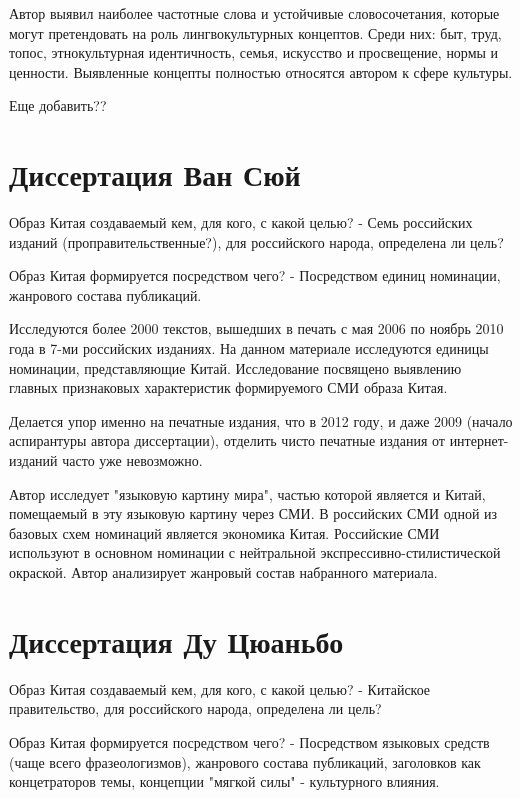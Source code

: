 \documentclass[11pt]{article}
\begin{document}
Автор выявил наиболее частотные слова и устойчивые словосочетания, которые могут претендовать на роль лингвокультурных концептов.
Среди них: быт, труд, топос, этнокультурная идентичность, семья, искусство и просвещение, нормы и ценности.
Выявленные концепты полностью относятся автором к сфере культуры.

Еще добавить??

\section{Диссертация Ван Сюй}\label{sec:section-wangxue}

Образ Китая создаваемый кем, для кого, с какой целью?
- Семь российских изданий (проправительственные?), для российского народа, определена ли цель?

Образ Китая формируется посредством чего?
- Посредством единиц номинации, жанрового состава публикаций.

Исследуются более 2000 текстов, вышедших в печать с мая 2006 по ноябрь 2010 года в 7-ми российских изданиях.
На данном материале исследуются единицы номинации, представляющие Китай.
Исследование посвящено выявлению главных признаковых характеристик формируемого СМИ образа Китая.

Делается упор именно на печатные издания, что в 2012 году, и даже 2009 (начало аспирантуры автора диссертации), отделить чисто печатные издания от интернет-изданий часто уже невозможно.

Автор исследует "языковую картину мира", частью которой является и Китай, помещаемый в эту языковую картину через СМИ.
В российских СМИ одной из базовых схем номинаций является экономика Китая.
Российские СМИ используют в основном номинации с нейтральной экспрессивно-стилистической окраской.
Автор анализирует жанровый состав набранного материала.

\section{Диссертация Ду Цюаньбо}\label{sec:section-duquanbo}

Образ Китая создаваемый кем, для кого, с какой целью?
- Китайское правительство, для российского народа, определена ли цель?

Образ Китая формируется посредством чего?
- Посредством языковых средств (чаще всего фразеологизмов), жанрового состава публикаций, заголовков как концетраторов темы, концепции "мягкой силы" - культурного влияния.
\end{document}
